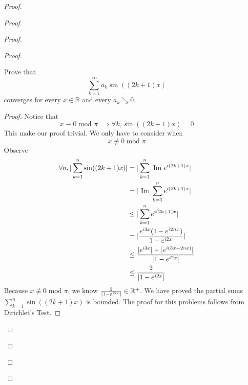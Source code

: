 \documentclass{report}
\begin{document}
\begin{proof}
\begin{proof}
\begin{proof}
\begin{proof}
\begin{question}{}{}
Prove that 
\[
\sum_{k=1}^{\infty} a_k \sin((2k + 1)x)
\]
converges for every \( x \in \mathbb{R} \) and every \( a_k \searrow 0 \).
\end{question}
\begin{proof}
Notice that  
\begin{equation}
x\equiv 0\text{ mod $\pi$}\implies \forall k,\sin ((2k+1)x)=0
\end{equation}
This make our proof trivial. We only have to consider when 
\begin{equation}
x\not\equiv 0\text{ mod }\pi
\end{equation}
Observe
\begin{align}
 \forall n, |\sum_{k=1}^n \sin((2k+1)x)|&= |\sum_{k=1}^n \text{ Im }e^{i(2k+1)x}|\\
  &=|\text{ Im }\sum_{k=1}^n e^{i(2k+1)x}|\\
  &\leq |\sum_{k=1}^n e^{i(2k+1)x}|\\
  &=|\frac{e^{i3x}(1-e^{i2nx})}{1-e^{i2x}}|\\
  &\leq \frac{|e^{i3x}|+|e^{i(3x+2nx)}|}{|1-e^{i2x}|}\\
  &\leq \frac{2}{|1-e^{i 2x}|}
\end{align}
Because $x\not\equiv 0\text{ mod $\pi$}$, we know $\frac{2}{|1-e^{i2x}|}\in\mathbb{R}^+$. We have proved the partial sums $\sum_{k=1}^n \sin((2k+1)x)$ is bounded. The proof for this problems follows from Dirichlet's Test.

\end{proof}


\end{proof}
\end{proof}
\end{proof}
\end{proof}
\end{document}
